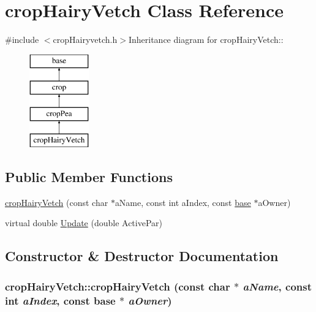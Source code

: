 \hypertarget{classcrop_hairy_vetch}{
\section{cropHairyVetch Class Reference}
\label{classcrop_hairy_vetch}
}


{\ttfamily \#include $<$cropHairyvetch.h$>$}Inheritance diagram for cropHairyVetch::\begin{figure}[H]
\begin{center}
\leavevmode
\includegraphics[height=4cm]{classcrop_hairy_vetch}
\end{center}
\end{figure}
\subsection*{Public Member Functions}
\begin{DoxyCompactItemize}
\item 
\hyperlink{classcrop_hairy_vetch_acd803a204780784fd3cf5fb7fb479df6}{cropHairyVetch} (const char $\ast$aName, const int aIndex, const \hyperlink{classbase}{base} $\ast$aOwner)
\item 
virtual double \hyperlink{classcrop_hairy_vetch_a4a1d386caee18a4ae111c5b8a1448d48}{Update} (double ActivePar)
\end{DoxyCompactItemize}


\subsection{Constructor \& Destructor Documentation}
\hypertarget{classcrop_hairy_vetch_acd803a204780784fd3cf5fb7fb479df6}{
\subsubsection[{cropHairyVetch}]{\setlength{\rightskip}{0pt plus 5cm}cropHairyVetch::cropHairyVetch (const char $\ast$ {\em aName}, \/  const int {\em aIndex}, \/  const {\bf base} $\ast$ {\em aOwner})}}
\label{classcrop_hairy_vetch_acd803a204780784fd3cf5fb7fb479df6}


